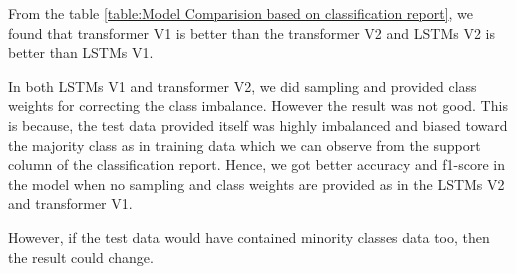 From the table \ref{table:Model Comparision based on classification report}, we found that transformer V1 is better than the transformer V2 and LSTMs V2 is better than LSTMs V1.

In both LSTMs V1 and transformer V2, we did sampling and provided class weights for correcting the class imbalance. However the result was not good. This is because, the test data provided itself was highly imbalanced and biased toward the majority class as in training data which we can observe from the support column of the classification report. Hence, we got better accuracy and f1-score in the model when no sampling and class weights are provided as in the LSTMs V2 and transformer V1. 

However, if the test data would have contained minority classes data too, then the result could change. 

